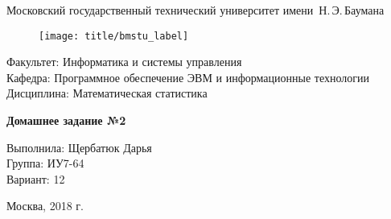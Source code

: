 
\thispagestyle{empty}

\begin{center}
    \Large
    Московский государственный технический университет имени~Н.\,Э.\,Баумана
\end{center}

\begin{figure}[h!]
    \begin{center}
        \texttt{[image: title/bmstu\_label]}
    \end{center}
\end{figure}

{\large
\noindent
Факультет: Информатика и системы управления\\[2mm]
\noindent
Кафедра: Программное обеспечение ЭВМ и информационные технологии\\[2mm]
\noindent
Дисциплина: Математическая статистика
\vspace{1.5cm}}

\begin{center}
    \Large
    \textbf{Домашнее задание №2} \\
\end{center}
\vfill

\hfill\begin{minipage}{0.35\textwidth}
    Выполнила: Щербатюк Дарья\\
    Группа: ИУ7-64 \\
    Вариант: 12
\end{minipage}
\vfill

\begin{center}
    Москва, 2018 г.
\end{center}